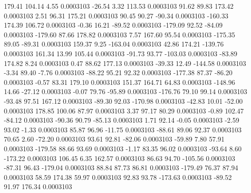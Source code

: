       179.41      104.14        4.55     0.0003103
      -26.54        3.32      113.53     0.0003103
       91.62       89.83      173.42     0.0003103
        2.51       96.31      175.21     0.0003103
       90.45       90.27      -90.34     0.0003103
     -160.33      174.39      106.72     0.0003103
       -0.36       16.21      -89.52     0.0003103
     -179.09       92.52      -84.09     0.0003103
     -179.60       87.66      178.82     0.0003103
        7.57      167.60       95.54     0.0003103
     -175.35       89.05      -89.31     0.0003103
      159.37        9.25     -163.04     0.0003103
       42.86      174.21     -139.76     0.0003103
      161.34       13.99      105.44     0.0003103
      -91.73       93.77     -103.03     0.0003103
      -83.89      174.82        8.24     0.0003103
        0.47       88.62      177.13     0.0003103
      -39.33       12.49     -144.58     0.0003103
       -3.34       89.40       -7.76     0.0003103
      -88.22       95.21       92.32     0.0003103
     -177.38       87.37      -86.20     0.0003103
       -0.57       83.31      179.10     0.0003103
      151.37      164.71       64.83     0.0003103
     -148.96       14.66      -27.12     0.0003103
       -0.07       79.76      -95.89     0.0003103
     -176.76       79.10       99.14     0.0003103
      -93.48       97.51      167.12     0.0003103
      -89.30       92.03     -170.98     0.0003103
      -42.83       10.01      -52.00     0.0003103
      178.85      100.06       87.97     0.0003103
        3.37       97.17       80.29     0.0003103
       -0.89      102.47      -84.12     0.0003103
      -90.36       90.79      -85.13     0.0003103
        1.71       92.14       -0.05     0.0003103
       -2.59       93.02       -1.33     0.0003103
       85.87       96.96      -11.75     0.0003103
      -88.61       89.06       92.37     0.0003103
       70.65        2.60      -72.20     0.0003103
       93.61       92.81      -82.06     0.0003103
      -59.89        7.80       57.91     0.0003103
     -179.58       88.66       93.69     0.0003103
       -1.17       83.35       96.02     0.0003103
      -93.64        8.60     -173.22     0.0003103
      106.45        6.35      162.57     0.0003103
       86.63       94.70     -105.56     0.0003103
      -87.31       96.43     -179.04     0.0003103
       88.84       87.73       86.81     0.0003103
     -179.49       76.37       87.94     0.0003103
       58.59      174.38       59.97     0.0003103
       92.83       93.78     -173.63     0.0003103
      -89.52       91.97      176.34     0.0003103
